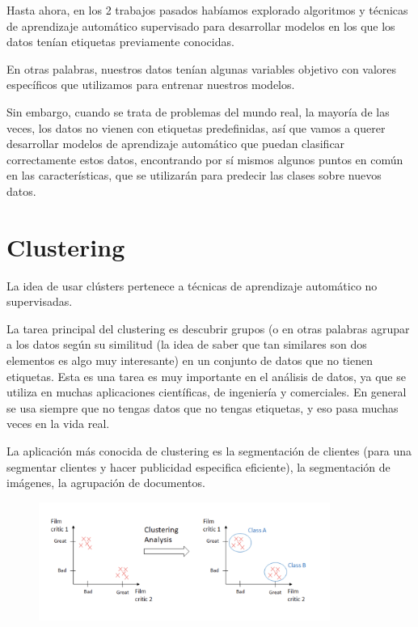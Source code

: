 \documentclass[12pt, fleqn]{report}                             %
\newcommand \Quote              {\qq}                           %
\theoremstyle{break}                                            %
\begin{document}
        Hasta ahora, en los 2 trabajos pasados habíamos explorado algoritmos y técnicas de aprendizaje
        automático supervisado para desarrollar modelos en los que los datos tenían etiquetas previamente
        conocidas.
        
        En otras palabras, nuestros datos tenían algunas variables objetivo con valores específicos que
        utilizamos para entrenar nuestros modelos.
        
        Sin embargo, cuando se trata de problemas del mundo real, la mayoría de las veces,
        los datos no vienen con etiquetas predefinidas, así que vamos a querer desarrollar
        modelos de aprendizaje automático que puedan clasificar correctamente estos datos, encontrando
        por sí mismos algunos puntos en común en las características, que se utilizarán para
        predecir las clases sobre nuevos datos.
    
    \chapter{Clustering}

        La idea de usar clústers pertenece a técnicas de aprendizaje automático no supervisadas.

        La tarea principal del clustering es descubrir grupos \Quote{naturales} (o en otras palabras
        agrupar a los datos según su similitud (la idea de saber que tan similares son dos elementos es algo muy interesante)
        en un conjunto de datos que no tienen
        etiquetas. Esta es una tarea es muy importante en el análisis de datos, ya que se utiliza en muchas
        aplicaciones científicas, de ingeniería y comerciales. En general se usa siempre que no tengas datos que no tengas
        etiquetas, y eso pasa muchas veces en la vida real.
        
        La aplicación más conocida de clustering es la segmentación de clientes
        (para una segmentar clientes y hacer publicidad especifica eficiente),
         la segmentación de imágenes, la agrupación de documentos.

        \begin{figure}[ht!]
            \centering
            \includegraphics[width=0.85\textwidth]{clustering}
        \end{figure}
        
\end{document}
